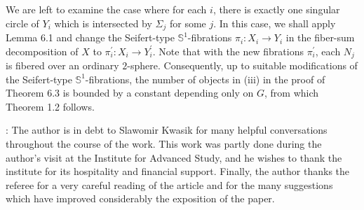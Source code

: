 \documentclass[11pt]{amsart}
\theoremstyle{plain}
\numberwithin{theorem}{section}
\theoremstyle{definition}
\begin{document}
We are left to examine the case where for each $i$, there is exactly one singular circle of 
$Y_i$ which is intersected by $\Sigma_j$ for some $j$. In this case, we shall apply Lemma 6.1
and change the Seifert-type ${{\mathbb S}}^1$-fibrations $\pi_i:X_i\rightarrow Y_i$ in the fiber-sum decomposition
of $X$ to $\pi^\prime_i:X_i\rightarrow Y_i^\prime$. Note that with the new fibrations $\pi_i^\prime$,
each $N_j$ is fibered over an ordinary $2$-sphere. Consequently, up to suitable modifications
of the Seifert-type ${{\mathbb S}}^1$-fibrations, the number of objects in (iii) in the proof of Theorem 6.3 is bounded 
by a constant depending only on $G$, from which Theorem 1.2 follows. 

\vspace{5mm}

: The author is in debt to Slawomir Kwasik for many helpful
conversations throughout the course of the work. This work was partly done during 
the author's visit at the Institute for Advanced Study, and he wishes to thank the institute for its 
hospitality and financial support. Finally, the author thanks the referee for a very careful reading 
of the article and for the many suggestions which have improved considerably the exposition of
the paper. 

\vspace{3mm}
\end{document}
